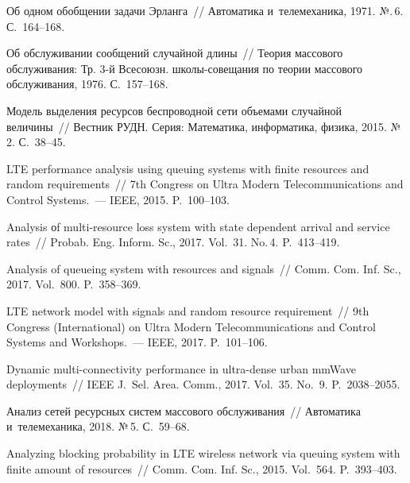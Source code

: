 \begin{multicols}{2}
{{\begin{thebibliography}{99}
Об одном обобщении задачи Эрланга~// {Автоматика и~телемеханика}, 1971. №.\,6. 
С.~164--168.

Об обслуживании сообщений случайной длины~// {Теория массового обслуживания: 
Тр. 3-й Всесоюзн. шко\-лы-со\-ве\-ща\-ния по тео\-рии массового обслуживания}, 1976. 
С.~157--168.

Модель выделения ресурсов беспроводной сети объемами случайной величины~// 
{Вестник РУДН. Серия: Математика, информатика, физика}, 2015. №\,2. С.~38--45.

LTE performance analysis using queuing systems with finite resources and random 
requirements~// {7th Congress on Ultra Modern Telecommunications and Control 
Systems}.~--- IEEE, 2015. P.~100--103.

Analysis оf multi-resource loss system with state dependent arrival and service 
rates~// {Probab.  Eng. Inform. Sc.}, 2017. 
Vol.~31. No.\,4. P.~413--419.

Analysis of queueing system with resources and signals~// {Comm.  
Com. Inf. Sc.}, 2017. Vol.~800. P.~358--369.

LTE network model with signals and random resource requirement~// {9th 
Congress (International) on Ultra Modern Telecommunications and Control Systems 
and Workshops}.~--- IEEE, 2017. P.~101--106.



Dynamic multi-connectivity performance in ultra-dense urban mmWave deployments~// 
{IEEE J.~Sel. Area. Comm.}, 2017. Vol.~35. No.~9. 
P.~2038--2055.

Анализ сетей ресурсных систем массового обслуживания~// {Автоматика 
и~телемеханика}, 2018. №\,5. С.~59--68.

Analyzing blocking probability in LTE wireless network via queuing system with 
finite amount of resources~// {Comm.  Com. Inf.
Sc.}, 2015. Vol.~564. P.~393--403.


\end{thebibliography}}}
\end{multicols}
